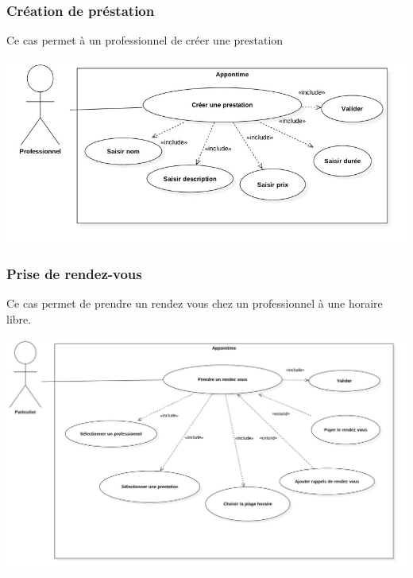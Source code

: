 \documentclass{article}
\begin{document}
\subsubsection{Création de préstation}
Ce cas permet à un professionnel de créer une prestation
\begin{center}
  \includegraphics[width=400pt]{diagram/useCaseCreerPrestation}
\end{center}
\subsubsection{Prise de rendez-vous}
Ce cas permet de prendre un rendez vous chez un professionnel à une horaire libre.
\begin{center}
  \includegraphics[width=400pt]{diagram/useCasePriseRdv}
\end{center}
\end{document}

